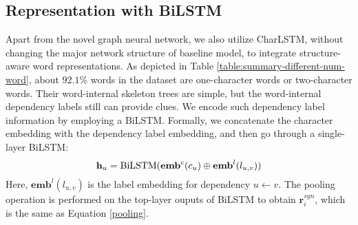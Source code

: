 \subsection{Representation with BiLSTM}
Apart from the novel graph neural network, we also utilize CharLSTM, without changing the major network structure of baseline model, to integrate structure-aware word representations.
As depicted in Table \ref{table:summary-different-num-word}, about $92.1\%$ words in the dataset are one-character words or two-character words.
Their word-internal skeleton trees are simple, but the word-internal dependency labels still can provide clues. We encode such dependency label information by employing a BiLSTM.
Formally, we concatenate the character embedding with the dependency label embedding, and then go through a single-layer BiLSTM:
\begin{equation}
    {\mathbf{h}}_{u} =\textup{BiLSTM}(\mathbf{emb}^{c}(c_u) \oplus \mathbf{emb}^{l}(l_{u,v}))
\end{equation}
Here, $\mathbf{emb}^{l}(l_{u,v})$ is the label embedding for dependency $u \leftarrow v$.
The pooling operation is performed on the top-layer ouputs of BiLSTM to obtain $\mathbf{r}_i^{syn}$, which is the same as Equation \ref{pooling}. 





